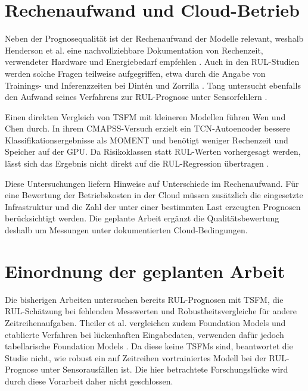\section{Rechenaufwand und Cloud-Betrieb}

Neben der Prognosequalität ist der Rechenaufwand der Modelle relevant, weshalb Henderson et al. eine nachvollziehbare Dokumentation von Rechenzeit, verwendeter Hardware und Energiebedarf empfehlen \parencite{hendersonSystematicReportingEnergy}. Auch in den \ac{RUL}-Studien werden solche Fragen teilweise aufgegriffen, etwa durch die Angabe von Trainings- und Inferenzzeiten bei Dintén und Zorrilla \parencite[255]{dintenUsingTimeSeries2025}. Tang untersucht ebenfalls den Aufwand seines Verfahrens zur \ac{RUL}-Prognose unter Sensorfehlern \parencite[19]{tangDeepLearningFramework2026}.

Einen direkten Vergleich von \ac{TSFM} mit kleineren Modellen führen Wen und Chen durch. In ihrem \ac{CMAPSS}-Versuch erzielt ein \ac{TCN}-Autoencoder bessere Klassifikationsergebnisse als MOMENT und benötigt weniger Rechenzeit und Speicher auf der \ac{GPU}. Da Risikoklassen statt \ac{RUL}-Werten vorhergesagt werden, lässt sich das Ergebnis nicht direkt auf die \ac{RUL}-Regression übertragen \parencite[2--5]{wenTimeSeriesFoundationModels2026}.

Diese Untersuchungen liefern Hinweise auf Unterschiede im Rechenaufwand. Für eine Bewertung der Betriebskosten in der Cloud müssen zusätzlich die eingesetzte Infrastruktur und die Zahl der unter einer bestimmten Last erzeugten Prognosen berücksichtigt werden. Die geplante Arbeit ergänzt die Qualitätsbewertung deshalb um Messungen unter dokumentierten Cloud-Bedingungen.

\section{Einordnung der geplanten Arbeit}

Die bisherigen Arbeiten untersuchen bereits \ac{RUL}-Prognosen mit \ac{TSFM}, die \ac{RUL}-Schätzung bei fehlenden Messwerten und Robustheitsvergleiche für andere Zeitreihenaufgaben. Theiler et al. vergleichen zudem Foundation Models und etablierte Verfahren bei lückenhaften Eingabedaten, verwenden dafür jedoch tabellarische Foundation Models \parencite[Abschn.~5.2 und 6.0.4]{theilerTowardsUnifiedDataEfficient2026}. Da diese keine \acp{TSFM} sind, beantwortet die Studie nicht, wie robust ein auf Zeitreihen vortrainiertes Modell bei der \ac{RUL}-Prognose unter Sensorausfällen ist. Die hier betrachtete Forschungslücke wird durch diese Vorarbeit daher nicht geschlossen.

